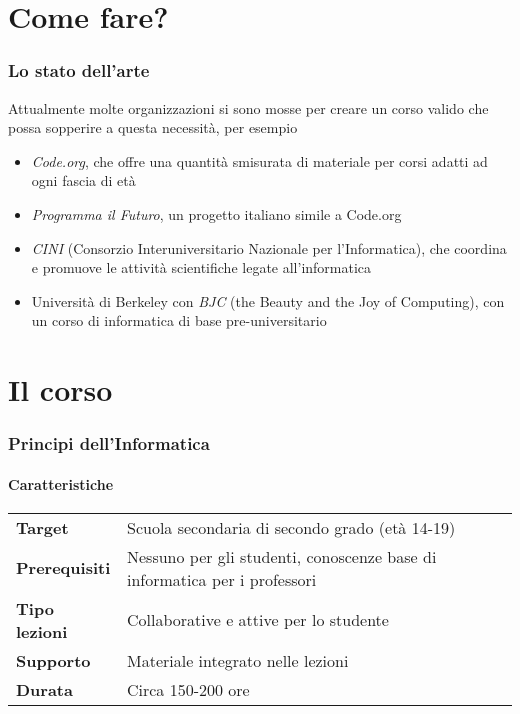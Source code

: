 \documentclass[
    hyperref={colorlinks,citecolor=black,linkcolor=black,urlcolor=blue}
]{beamer}
\begin{document}
\section{Come fare?}

\begin{frame}
  \frametitle{Lo stato dell'arte}

  Attualmente molte organizzazioni si sono mosse per creare un corso valido che possa sopperire a questa necessità, per esempio
  
  \begin{itemize}
    \item \emph{Code.org}, che offre una quantità smisurata di materiale per corsi adatti ad ogni fascia di età
    \item \emph{Programma il Futuro}, un progetto italiano simile a Code.org
    \item \emph{CINI} (Consorzio Interuniversitario Nazionale per l'Informatica), che coordina e promuove le attività scientifiche legate all'informatica
    \item Università di Berkeley con \emph{BJC} (the Beauty and the Joy of Computing), con un corso di informatica di base pre-universitario
  \end{itemize}
\end{frame}

\section{Il corso}

\begin{frame}
  \frametitle{Principi dell'Informatica}
  \framesubtitle{Caratteristiche}

  \begin{table}
  \begin{tabular}{l p{75mm}}
    \textbf{Target} & Scuola secondaria di secondo grado (età 14-19) \\
    \textbf{Prerequisiti} & Nessuno per gli studenti, conoscenze base di informatica per i professori \\
    \textbf{Tipo lezioni} & Collaborative e attive per lo studente \\
    \textbf{Supporto} & Materiale integrato nelle lezioni \\
    \textbf{Durata} & Circa 150-200 ore
  \end{tabular}
  \end{table}
\end{frame}
\end{document}
